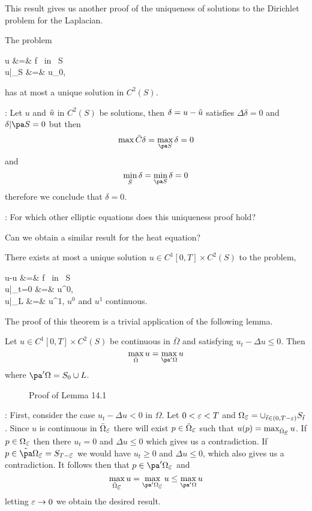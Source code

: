 This result gives us another proof of the uniqueness of solutions to the Dirichlet problem for the Laplacian.

The problem 

\beq
{} 
\Delta u &=& f \;\;\;\mbox{ in } S\\
u|_{\pa S} &=& u_0, 
\earr
\eeq

has at most a unique solution in $C^2(S)$. 
\eteo

\pru: 
Let $u$ and $\tilde u$ in $C^2(S)$ be solutions, then $\delta = u - \tilde u$ satisfies $\Delta \delta = 0$ and $\delta|{\pa S}= 0$ but then 
\[ \max{\bar C} \delta = \max_{\pa S} \delta = 0 
\] 
and 
\[ \min_{\bar S} \delta = \min_{\pa S} \delta = 0 
\]
%
therefore we conclude that $\delta = 0$.

\ejer: For which other elliptic equations does this uniqueness proof hold? \espa

\noi Can we obtain a similar result for the heat equation?

 There exists at most a unique solution
$u \in C^1[0,T] \times C^2(S)$ to the problem,

\beq
{} 
\dot u-\Delta u &=& f \;\;\;\mbox{ in } S\\ 
u|_{t=0} &=& u^0,\\ 
u|_L &=& u^1, 
\earr 
\eeq 
% 
$u^0$ and $u^1$ continuous.

\eteo 
The proof of this theorem is a trivial application of the following lemma.

\blem 
\label{14.x} Let $u \in C^1[0,T] \times C^2(S)$ be continuous in $\bar \Omega$ and satisfying $u_t - \Delta u \leq 0$.
Then 
\[ 
\max_{\bar \Omega} u = \max_{\pa' \Omega} u 
\] %
where $\pa'\Omega = S_0 \cup L$. 
\elem

\espa 

\begin{figure}[htbp] 
    \begin{center} 
        \caption{Proof of Lemma 14.1} 
        \label{fig:14_2} 
    \end{center}
\end{figure}

\pru: First, consider the case $u_t - \Delta u <0$ in $\Omega$. Let $0< \mbox{$\varepsilon$} < T$ and $\Omega_{\mbox{$\varepsilon$}} = {\cup_{\tilde t\in(0,T-\varepsilon)} S_{\tilde t}}$.
Since $u$ is continuous in $\bar \Omega_{\mbox{$\varepsilon$}}$ there will exist $p \in \bar \Omega_{\mbox{$\varepsilon$}}$ such that $u(p) = \max_{\bar \Omega_{\mbox{$\varepsilon$}}}u$.
If $p \in \Omega_{\mbox{$\varepsilon$}}$ then there $u_t = 0$ and $\Delta u \leq 0$ which gives us a contradiction.
If $p \in \ti \pa \Omega_{\eps} = S_{T-\eps}$ we would have $u_t \geq 0$ and $\Delta u \leq 0$, which also gives us a contradiction.
It follows then that $p \in \pa'\Omega_{\eps}$ and 
\[ 
\max_{\bar \Omega_{\eps}} u = \max_{\pa'\Omega_{\eps}} u \leq \max_{\pa'\Omega} u 
\] 
letting $\mbox{$\varepsilon$} \rightarrow 0$ we obtain the desired result.

